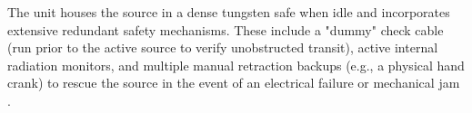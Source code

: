 The unit houses the source in a dense tungsten safe when idle and incorporates extensive redundant safety mechanisms. These include a "dummy" check cable (run prior to the active source to verify unobstructed transit), active internal radiation monitors, and multiple manual retraction backups (e.g., a physical hand crank) to rescue the source in the event of an electrical failure or mechanical jam \cite{jayaraman1992clinical}.

